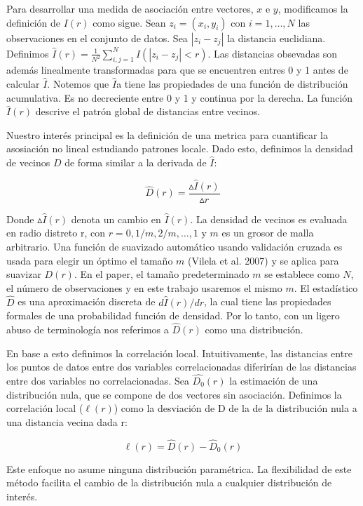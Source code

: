 	Para desarrollar una medida de asociaci\'on entre vectores, $x$ e $y$, modificamos la definici\'on de $I(r)$ como sigue. Sean $z_i=(x_i,y_i)$ con $i=1,\dots, N$ las observaciones en el conjunto de datos. Sea $|z_i-z_j|$ la distancia euclidiana. Definimos $\hat{I}(r)=\frac{1}{N^{2}} \sum_{i, j=1}^{N} I\left(\left|z_{i}-z_{j}\right|<r\right)$. Las distancias obsevadas son adem\'as linealmente transformadas para que se encuentren entres 0 y 1 antes de calcular $\hat{I}$. Notemos que $\hat{I}$a tiene las propiedades de una funci\'on de distribuci\'on acumulativa. Es no decreciente entre 0 y 1 y continua por la derecha. La funci\'on $\hat{I}(r)$ descrive el patr\'on global de distancias entre vecinos. 

	Nuestro inter\'es principal es la definici\'on  de una metrica para cuantificar la asosiaci\'on no lineal estudiando patrones locale. Dado esto, definimos la densidad de vecinos $D$ de forma similar a la derivada de $\hat{I}$: 

	$$
		\hat{D}(r)= \frac{\vartriangle\hat{I}(r)}{\vartriangle r}
	$$

	Donde $\vartriangle\hat{I}(r)$ denota un cambio en $\hat{I}(r)$. La densidad de vecinos es evaluada en radio distreto r, con $r=0,1/m, 2/m, \dots, 1$  y $m$ es un grosor de malla arbitrario. Una funci\'on de suavizado autom\'atico usando validaci\'on cruzada es usada para elegir un \'optimo el tama\~no $m$ (Vilela et al. 2007) y se aplica para suavizar $D(r)$. En el paper, el tama\~no predeterminado $m$ se establece como $N$, el n\'umero de observaciones y en este trabajo usaremos el mismo $m$. El estad\'istico $\hat{D}$ es una aproximaci\'on discreta de $d\hat{I}(r)/d r$, la cual tiene las propiedades formales de una probabilidad funci\'on de densidad. Por lo tanto, con un ligero abuso de terminolog\'ia nos referimos a $\widehat{D}(r)$ como una distribuci\'on.

	En base a esto definimos la correlaci\'on local. Intuitivamente, las distancias entre los puntos de datos entre dos variables correlacionadas diferir\'ian de las distancias entre dos variables no correlacionadas. Sea $\widehat{D_0}(r)$ la estimaci\'on de una distribuci\'on nula, que se compone de dos vectores sin asociaci\'on. Definimos la correlaci\'on local ($\ell(r)$) como la desviaci\'on de D de la de la distribuci\'on nula a una distancia vecina dada r:

	$$
		\ell(r)=\widehat{D}(r)-\widehat{D}_{0}(r)
	$$

	Este enfoque no asume ninguna distribuci\'on param\'etrica. La flexibilidad de este m\'etodo facilita el cambio de la distribuci\'on nula a cualquier distribuci\'on de inter\'es. 
	
